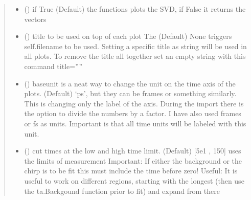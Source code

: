 \documentclass[letterpaper,10pt,english]{sphinxmanual}
\begin{document}
\begin{fulllineitems}
\begin{quote}
\begin{description}
\begin{itemize}
\item {} 
 () \textendash{} if True (Default) the functions plots the SVD, if False it returns the vectors

\item {} 
 () \textendash{} title to be used on top of each plot
The (Default) None triggers  self.filename to be used. Setting a specific title as string will
be used in all plots. To remove the title all together set an empty string with this command title=””

\item {} 
 () \textendash{} baseunit is a neat way to change the unit on the time axis of the plots. (Default) ‘ps’, but they
can be frames or something similarly. This is changing only the label of the axis.
During the import there is the option to divide the numbers by a factor.
I have also used frames or fs as units. Important is that all time units will be labeled with
this unit.

\item {} 
 (\sphinxstyleliteralemphasis{\sphinxupquote{ (}}\sphinxstyleliteralemphasis{\sphinxupquote{)}}\sphinxstyleliteralemphasis{\sphinxupquote{, }}) \textendash{} cut times at the low and high time limit. (Default) {[}5e\sphinxhyphen{}1 , 150{]} uses the limits of measurement
Important: If either the background or the chirp is to be fit this must include the
time before zero! Useful: It is useful to work on different regions, starting with
the longest (then use the ta.Backgound function prior to fit) and expand from there


\end{itemize}
\end{description}
\end{quote}
\end{fulllineitems}
\end{document}
